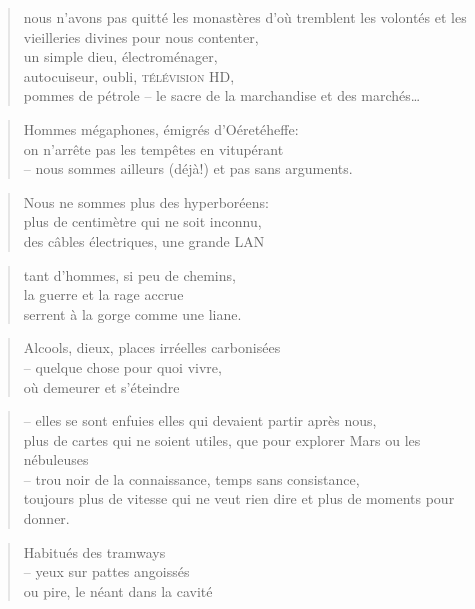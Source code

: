   \begin{verse}
    nous n’avons pas quitté les monastères d’où tremblent les volontés
    et les vieilleries divines pour nous contenter,\\
    un simple dieu, électroménager, \\
    autocuiseur, oubli, \textsc{télévision HD},\\
    pommes de pétrole -- le sacre de la marchandise et des marchés…
  \end{verse}
  \begin{verse}
    Hommes mégaphones, émigrés d’Oéretéheffe:\\
    on n’arrête pas les tempêtes en vitupérant\\
    -- nous sommes ailleurs (déjà!) et pas sans arguments.
  \end{verse}
  \begin{verse}
    Nous ne sommes plus des hyperboréens:\\
    plus de centimètre qui ne soit inconnu,\\
    des câbles électriques, une grande LAN
  \end{verse}
  \begin{verse}
    tant d’hommes, si peu de chemins,\\
    la guerre et la rage accrue\\
    serrent à la gorge comme une liane.
  \end{verse}
  \begin{verse}
    Alcools, dieux, places irréelles carbonisées\\
    -- quelque chose pour quoi vivre,\\
    où demeurer et s’éteindre
  \end{verse}
  \begin{verse}
    -- elles se sont enfuies elles qui devaient partir après nous,\\
    plus de cartes qui ne soient utiles, que pour explorer Mars ou les nébuleuses\\
    -- trou noir de la connaissance, temps sans consistance,\\
    toujours plus de vitesse qui ne veut rien dire et plus de moments pour donner.
  \end{verse}
  \begin{verse}
    Habitués des tramways\\
    -- yeux sur pattes angoissés\\
    ou pire, le néant dans la cavité
  \end{verse}
